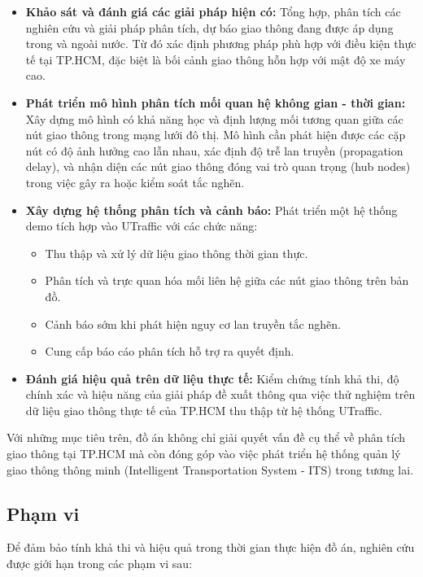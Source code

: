 \begin{itemize}
    \item \textbf{Khảo sát và đánh giá các giải pháp hiện có:} Tổng hợp, phân tích các nghiên cứu và giải pháp phân tích, dự báo giao thông đang được áp dụng trong và ngoài nước. Từ đó xác định phương pháp phù hợp với điều kiện thực tế tại TP.HCM, đặc biệt là bối cảnh giao thông hỗn hợp với mật độ xe máy cao.
    
    \item \textbf{Phát triển mô hình phân tích mối quan hệ không gian - thời gian:} Xây dựng mô hình có khả năng học và định lượng mối tương quan giữa các nút giao thông trong mạng lưới đô thị. Mô hình cần phát hiện được các cặp nút có độ ảnh hưởng cao lẫn nhau, xác định độ trễ lan truyền (propagation delay), và nhận diện các nút giao thông đóng vai trò quan trọng (hub nodes) trong việc gây ra hoặc kiểm soát tắc nghẽn.
    
    \item \textbf{Xây dựng hệ thống phân tích và cảnh báo:} Phát triển một hệ thống demo tích hợp vào UTraffic với các chức năng:
    \begin{itemize}
        \item Thu thập và xử lý dữ liệu giao thông thời gian thực.
        \item Phân tích và trực quan hóa mối liên hệ giữa các nút giao thông trên bản đồ.
        \item Cảnh báo sớm khi phát hiện nguy cơ lan truyền tắc nghẽn.
        \item Cung cấp báo cáo phân tích hỗ trợ ra quyết định.
    \end{itemize}
    
    \item \textbf{Đánh giá hiệu quả trên dữ liệu thực tế:} Kiểm chứng tính khả thi, độ chính xác và hiệu năng của giải pháp đề xuất thông qua việc thử nghiệm trên dữ liệu giao thông thực tế của TP.HCM thu thập từ hệ thống UTraffic.
\end{itemize}

Với những mục tiêu trên, đồ án không chỉ giải quyết vấn đề cụ thể về phân tích giao thông tại TP.HCM mà còn đóng góp vào việc phát triển hệ thống quản lý giao thông thông minh (Intelligent Transportation System - ITS) trong tương lai.

\newpage
\subsection{Phạm vi}
Để đảm bảo tính khả thi và hiệu quả trong thời gian thực hiện đồ án, nghiên cứu được giới hạn trong các phạm vi sau:


